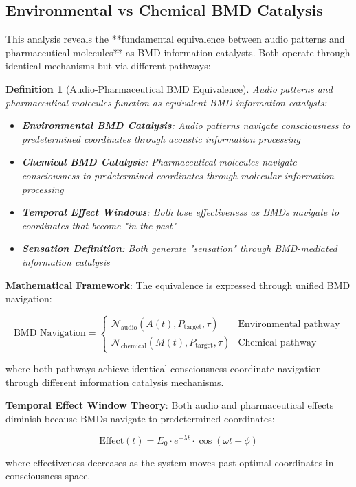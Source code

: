 \documentclass[12pt,a4paper]{article}
\newtheorem{definition}[theorem]{Definition}
\begin{document}
\subsection{Environmental vs Chemical BMD Catalysis}

This analysis reveals the **fundamental equivalence between audio patterns and pharmaceutical molecules** as BMD information catalysts. Both operate through identical mechanisms but via different pathways:

\begin{definition}[Audio-Pharmaceutical BMD Equivalence]
Audio patterns and pharmaceutical molecules function as equivalent BMD information catalysts:
\begin{itemize}
\item \textbf{Environmental BMD Catalysis}: Audio patterns navigate consciousness to predetermined coordinates through acoustic information processing
\item \textbf{Chemical BMD Catalysis}: Pharmaceutical molecules navigate consciousness to predetermined coordinates through molecular information processing
\item \textbf{Temporal Effect Windows}: Both lose effectiveness as BMDs navigate to coordinates that become "in the past"
\item \textbf{Sensation Definition}: Both generate "sensation" through BMD-mediated information catalysis
\end{itemize}
\end{definition}

\textbf{Mathematical Framework}:
The equivalence is expressed through unified BMD navigation:

$$\text{BMD Navigation} = \begin{cases} 
\mathcal{N}_{\text{audio}}(A(t), P_{\text{target}}, \tau) & \text{Environmental pathway} \\
\mathcal{N}_{\text{chemical}}(M(t), P_{\text{target}}, \tau) & \text{Chemical pathway}
\end{cases}$$

where both pathways achieve identical consciousness coordinate navigation through different information catalysis mechanisms.

\textbf{Temporal Effect Window Theory}:
Both audio and pharmaceutical effects diminish because BMDs navigate to predetermined coordinates:

$$\text{Effect}(t) = E_0 \cdot e^{-\lambda t} \cdot \cos(\omega t + \phi)$$

where effectiveness decreases as the system moves past optimal coordinates in consciousness space.
\end{document}
